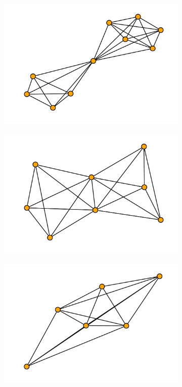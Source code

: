 \documentclass{article}
\begin{document}
\begin{figure}[!hbtp]
\begin{subfigure}{0.3\textwidth}
        \includegraphics[width=\textwidth]{./assets/images/coauthor02.pdf}
    \end{subfigure}
    \begin{subfigure}{0.3\textwidth}
        \includegraphics[width=\textwidth]{./assets/images/coauthor03.pdf}
    \end{subfigure}
    \begin{subfigure}{0.3\textwidth}
        \includegraphics[width=\textwidth]{./assets/images/coauthor04.pdf}

\end{subfigure}
\end{figure}
\end{document}
